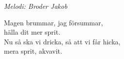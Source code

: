 {\footnotesize\textit{Melodi: Broder Jakob}}\par
\vspace{10pt}
Magen brummar, jag försummar,\\
hälla dit mer sprit.\\
Nu så ska vi dricka, så att vi får hicka,\\
mera sprit, akvavit.
